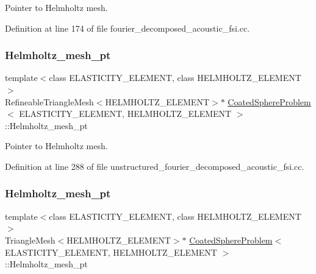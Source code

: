 Pointer to Helmholtz mesh. 



Definition at line 174 of file fourier\+\_\+decomposed\+\_\+acoustic\+\_\+fsi.\+cc.

\mbox{\label{classCoatedSphereProblem_a5f7a85c289bde4728679f8939f4283ad}} 
\subsubsection{\texorpdfstring{Helmholtz\+\_\+mesh\+\_\+pt}{Helmholtz\_mesh\_pt}\hspace{0.1cm}{\footnotesize\ttfamily [2/3]}}
{\footnotesize\ttfamily template$<$class E\+L\+A\+S\+T\+I\+C\+I\+T\+Y\+\_\+\+E\+L\+E\+M\+E\+NT, class H\+E\+L\+M\+H\+O\+L\+T\+Z\+\_\+\+E\+L\+E\+M\+E\+NT$>$ \\
Refineable\+Triangle\+Mesh$<$H\+E\+L\+M\+H\+O\+L\+T\+Z\+\_\+\+E\+L\+E\+M\+E\+NT$>$$\ast$ \hyperlink{classCoatedSphereProblem}{Coated\+Sphere\+Problem}$<$ E\+L\+A\+S\+T\+I\+C\+I\+T\+Y\+\_\+\+E\+L\+E\+M\+E\+NT, H\+E\+L\+M\+H\+O\+L\+T\+Z\+\_\+\+E\+L\+E\+M\+E\+NT $>$\+::Helmholtz\+\_\+mesh\+\_\+pt\hspace{0.3cm}{\ttfamily [private]}}



Pointer to Helmholtz mesh. 



Definition at line 288 of file unstructured\+\_\+fourier\+\_\+decomposed\+\_\+acoustic\+\_\+fsi.\+cc.

\mbox{\label{classCoatedSphereProblem_aabab389170891d6387c3cd9a7aa92f24}} 
\subsubsection{\texorpdfstring{Helmholtz\+\_\+mesh\+\_\+pt}{Helmholtz\_mesh\_pt}\hspace{0.1cm}{\footnotesize\ttfamily [3/3]}}
{\footnotesize\ttfamily template$<$class E\+L\+A\+S\+T\+I\+C\+I\+T\+Y\+\_\+\+E\+L\+E\+M\+E\+NT, class H\+E\+L\+M\+H\+O\+L\+T\+Z\+\_\+\+E\+L\+E\+M\+E\+NT$>$ \\
Triangle\+Mesh$<$H\+E\+L\+M\+H\+O\+L\+T\+Z\+\_\+\+E\+L\+E\+M\+E\+NT$>$$\ast$ \hyperlink{classCoatedSphereProblem}{Coated\+Sphere\+Problem}$<$ E\+L\+A\+S\+T\+I\+C\+I\+T\+Y\+\_\+\+E\+L\+E\+M\+E\+NT, H\+E\+L\+M\+H\+O\+L\+T\+Z\+\_\+\+E\+L\+E\+M\+E\+NT $>$\+::Helmholtz\+\_\+mesh\+\_\+pt\hspace{0.3cm}{\ttfamily [private]}}



